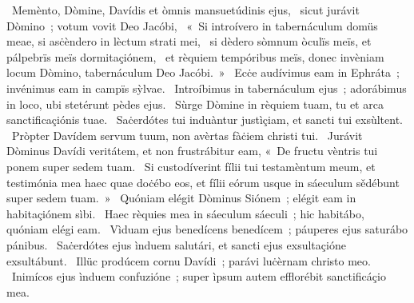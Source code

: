 ~Memènto, Dòmine, Davídis et òmnis mansuetúdinis ejus, 
~sicut jurávit Dòmino~; votum vovit Deo Jacóbi, 
~«~Si introívero in tabernáculum domüs meae, si asċèndero in lèctum strati mei, 
~si dèdero sòmnum òculïs meïs, et pálpebrïs meïs dormitaçiónem, 
~et rèquiem tempóribus meïs, donec invèniam locum Dòmino, tabernáculum Deo Jacóbi.~»
~Ecċe audívimus eam in Ephráta~; invénimus eam in campïs sỳlvae. 
~Introíbimus in tabernáculum ejus~; adorábimus in loco, ubi stetérunt pèdes ejus. 
~Sùrge Dòmine in rèquiem tuam, tu et arca sanctificaçiónis tuae. 
~Saċerdótes tui induàntur justìçiam, et sancti tui exsùltent. 
~Pròpter Davídem servum tuum, non avèrtas fàċiem christi tui. 
~Jurávit Dòminus Davídi veritátem, et non frustrábitur eam, «~De fructu vèntris tui ponem super sedem tuam. 
~Si custodíverint fílii tui testamèntum meum, et testimónia mea haec quae doċébo eos, et fílii eórum usque in sáeculum sědébunt super sedem tuam.~»
~Quóniam elégit Dòminus Siónem~; elégit eam in habitaçiónem sìbi. 
~Haec rèquies mea in sáeculum sáeculi~; hic habitábo, quóniam elégi eam. 
~Vìduam ejus benedícens benedícem~; páuperes ejus saturábo pánibus. 
~Saċerdótes ejus ìnduem salutári, et sancti ejus exsultaçióne exsultábunt. 
~Illüc prodúcem cornu Davídi~; parávi luċèrnam christo meo. 
~Inimícos ejus ìnduem confuzióne~; super ìpsum autem efflorébit sanctificáçio mea. 
